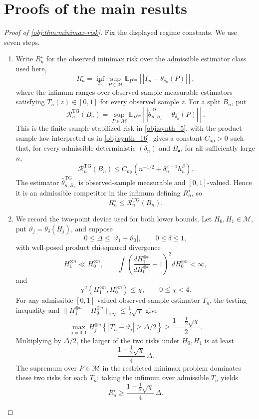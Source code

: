 \documentclass[11pt]{article}
\begin{document}
\section{Proofs of the main results}\label{sec:deferred-proofs}

\begin{proof}[Proof of \cref{obj:thm:minimax-risk}]
Fix the displayed regime constants.  We use seven steps.

\begin{enumerate}
\item Write \(R_n^\star\) for the observed minimax risk over the admissible estimator class used here,
\[
R_n^\star
=
\inf_{T_n}
\sup_{P\in\mathcal M}
\mathbb E_{P^{\otimes n}}
\left[
\left|T_n-\theta_{\delta_n}(P)\right|
\right],
\]
where the infimum ranges over observed-sample measurable estimators satisfying
\(T_n(z)\in[0,1]\) for every observed sample \(z\).  For a split \(B_n\), put
\[
\mathcal R_n^{\mathrm{TG}}(B_n)
=
\sup_{P\in\mathcal M}
\mathbb E_{P^{\otimes n}}
\left[
\left|\widehat\theta_{n,B_n}^{\mathrm{TG}}-\theta_{\delta_n}(P)\right|
\right].
\]
This is the finite-sample stabilized risk in \cref{obj:synth_5}, with the product
sample law interpreted as in \cref{obj:synth_16}.  
gives a constant \(C_{\mathrm{up}}>0\) such that, for every admissible deterministic
\((\delta_n)\) and \(B_\bullet\), for all sufficiently large \(n\),
\[
\mathcal R_n^{\mathrm{TG}}(B_n)
\le
C_{\mathrm{up}}
\left(n^{-1/2}+\delta_n^{\kappa+1}h_n^\beta\right).
\]
The estimator \(\widehat\theta_{n,B_n}^{\mathrm{TG}}\) is observed-sample measurable and
\([0,1]\)-valued. Hence it is an admissible competitor in the infimum defining
\(R_n^\star\), so
\[
R_n^\star\le \mathcal R_n^{\mathrm{TG}}(B_n).
\]

\item We record the two-point device used for both lower bounds.  Let
\(H_0,H_1\in\mathcal M\), put \(\vartheta_j=\theta_\delta(H_j)\), and suppose
\[
0\le \Delta\le |\vartheta_1-\vartheta_0|,
\qquad
0\le\delta\le1,
\]
with well-posed product chi-squared divergence
\[
H_1^{\otimes n}\ll H_0^{\otimes n},
\qquad
\int\left(\frac{dH_1^{\otimes n}}{dH_0^{\otimes n}}-1\right)^2dH_0^{\otimes n}<\infty,
\]
and
\[
\chi^2(H_1^{\otimes n},H_0^{\otimes n})\le \chi,
\qquad
0\le\chi<4 .
\]
For any admissible \([0,1]\)-valued observed-sample estimator \(T_n\), the testing
inequality and
\(\|H_1^{\otimes n}-H_0^{\otimes n}\|_{\mathrm{TV}}
\le \frac12\sqrt{\chi}\) give
\[
\max_{j=0,1}
H_j^{\otimes n}
\left\{
|T_n-\vartheta_j|\ge \Delta/2
\right\}
\ge
\frac{1-\frac12\sqrt{\chi}}{2}.
\]
Multiplying by \(\Delta/2\), the larger of the two risks under \(H_0,H_1\) is at least
\[
\frac{1-\frac12\sqrt{\chi}}{4}\,\Delta .
\]
The supremum over \(P\in\mathcal M\) in the restricted minimax problem dominates these
two risks for each \(T_n\); taking the infimum over admissible \(T_n\) yields
\[
R_n^\star
\ge
\frac{1-\frac12\sqrt{\chi}}{4}\,\Delta .
\]


\end{enumerate}
\end{proof}
\end{document}
